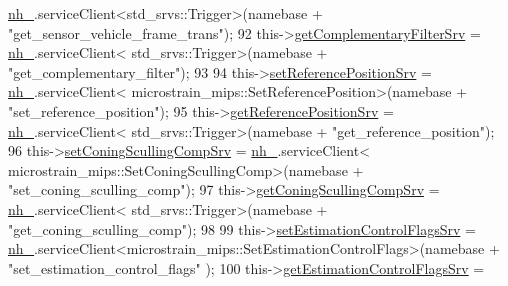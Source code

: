 \begin{DoxyCode}
      \hyperlink{classmicrostrain__mips__client_1_1ClMicrostainMips_a9fa8bd8b528fb13bf655f87b950a145c}{nh\_}.serviceClient<std\_srvs::Trigger>(namebase + \textcolor{stringliteral}{"get\_sensor\_vehicle\_frame\_trans"});
92                 this->\hyperlink{classmicrostrain__mips__client_1_1ClMicrostainMips_a6011cb4bf116dc0b92eff7b3409c3633}{getComplementaryFilterSrv} = \hyperlink{classmicrostrain__mips__client_1_1ClMicrostainMips_a9fa8bd8b528fb13bf655f87b950a145c}{nh\_}.serviceClient<
      std\_srvs::Trigger>(namebase + \textcolor{stringliteral}{"get\_complementary\_filter"});
93 
94                 this->\hyperlink{classmicrostrain__mips__client_1_1ClMicrostainMips_a9f088d1a085409bf8a952fac38e8f3d3}{setReferencePositionSrv} = \hyperlink{classmicrostrain__mips__client_1_1ClMicrostainMips_a9fa8bd8b528fb13bf655f87b950a145c}{nh\_}.serviceClient<
      microstrain\_mips::SetReferencePosition>(namebase + \textcolor{stringliteral}{"set\_reference\_position"});
95                 this->\hyperlink{classmicrostrain__mips__client_1_1ClMicrostainMips_a9bf74f33ad09f1159a1b2a91e34df8e9}{getReferencePositionSrv} = \hyperlink{classmicrostrain__mips__client_1_1ClMicrostainMips_a9fa8bd8b528fb13bf655f87b950a145c}{nh\_}.serviceClient<
      std\_srvs::Trigger>(namebase + \textcolor{stringliteral}{"get\_reference\_position"});
96                 this->\hyperlink{classmicrostrain__mips__client_1_1ClMicrostainMips_a4673167297fb4266bc2f2bcfa8d5af13}{setConingScullingCompSrv} = \hyperlink{classmicrostrain__mips__client_1_1ClMicrostainMips_a9fa8bd8b528fb13bf655f87b950a145c}{nh\_}.serviceClient<
      microstrain\_mips::SetConingScullingComp>(namebase + \textcolor{stringliteral}{"set\_coning\_sculling\_comp"});
97                 this->\hyperlink{classmicrostrain__mips__client_1_1ClMicrostainMips_a3958027a0410f29a4c6e0f7376a3665b}{getConingScullingCompSrv} = \hyperlink{classmicrostrain__mips__client_1_1ClMicrostainMips_a9fa8bd8b528fb13bf655f87b950a145c}{nh\_}.serviceClient<
      std\_srvs::Trigger>(namebase + \textcolor{stringliteral}{"get\_coning\_sculling\_comp"});
98 
99                 this->\hyperlink{classmicrostrain__mips__client_1_1ClMicrostainMips_a13132b27dff7c8527c42e91dc7dccb39}{setEstimationControlFlagsSrv} = 
      \hyperlink{classmicrostrain__mips__client_1_1ClMicrostainMips_a9fa8bd8b528fb13bf655f87b950a145c}{nh\_}.serviceClient<microstrain\_mips::SetEstimationControlFlags>(namebase + \textcolor{stringliteral}{"set\_estimation\_control\_flags"}
      );
100                 this->\hyperlink{classmicrostrain__mips__client_1_1ClMicrostainMips_a8f9c894cf9a370cabb071df0c5aaad00}{getEstimationControlFlagsSrv} = 

\end{DoxyCode}
